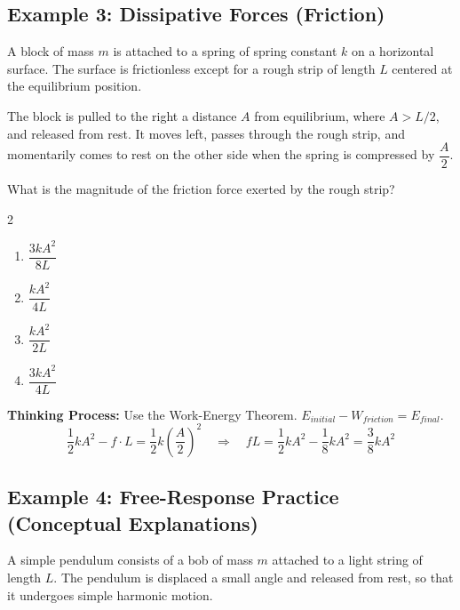\documentclass[12pt]{article}
\begin{document}
\vspace{0.3cm}

\subsection*{Example 3: Dissipative Forces (Friction)}
A block of mass $m$ is attached to a spring of spring constant $k$ on a horizontal surface. The surface is frictionless except for a rough strip of length $L$ centered at the equilibrium position.

The block is pulled to the right a distance $A$ from equilibrium, where $A>L/2$, and released from rest. It moves left, passes through the rough strip, and momentarily comes to rest on the other side when the spring is compressed by $\dfrac{A}{2}$.

What is the magnitude of the friction force exerted by the rough strip?

\begin{multicols}{2}
\begin{enumerate}[label=\textbf{\Alph*.}]
\item $\dfrac{3kA^2}{8L}$
\item $\dfrac{kA^2}{4L}$
\item $\dfrac{kA^2}{2L}$
\item $\dfrac{3kA^2}{4L}$
\end{enumerate}
\end{multicols}

\textbf{Thinking Process:} Use the Work-Energy Theorem. $E_{initial} - W_{friction} = E_{final}$. 
\[ \frac{1}{2}kA^2 - f \cdot L = \frac{1}{2}k\left(\frac{A}{2}\right)^2 \quad \Rightarrow \quad fL = \frac{1}{2}kA^2 - \frac{1}{8}kA^2 = \frac{3}{8}kA^2 \]

\vspace{0.3cm}

\subsection*{Example 4: Free-Response Practice (Conceptual Explanations)}
A simple pendulum consists of a bob of mass $m$ attached to a light string of length $L$. The pendulum is displaced a small angle and released from rest, so that it undergoes simple harmonic motion.
\end{document}
